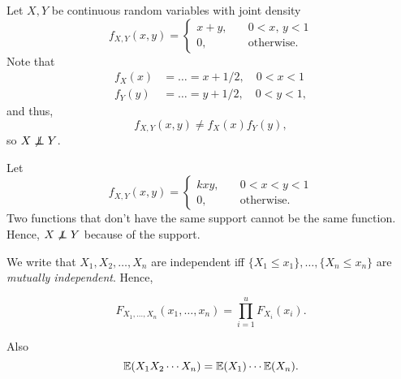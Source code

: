 \begin{eg}
Let $X,Y$ be continuous random variables with joint density
$$
f_{X,Y}(x,y)=\begin{cases}x+y, \quad &0<x, \, y<1 \\ 0, &\text{otherwise}.\end{cases}
$$
Note that
\begin{align*}
    f_X(x)&=\ldots=x+1/2, \quad 0<x<1 \\
    f_Y(y)&=\ldots=y+1/2,\quad 0<y<1,
\end{align*}
and thus,
$$
f_{X,Y}(x,y)\neq f_X(x)f_Y(y),
$$
so $X\not \ind Y$.
\end{eg}

\begin{eg}
Let
$$f_{X,Y}(x,y)=
\begin{cases}kxy, \quad &0<x< y<1 \\ 0, \quad &\text{otherwise}.\end{cases}$$
Two functions that don't have the same support cannot be the same function. Hence, $X\not\ind Y$ because of the support.
\end{eg}

\begin{notation}
		We write that $X_1,X_2,\ldots,X_n$ are independent iff $\{X_1\leq x_1\},\dots,\{X_n\leq x_n\}$ are \textit{mutually independent}. Hence,

$$F_{X_1,\ldots,X_n}(x_1,\dots,x_n)=\prod^u_{i=1} F_{X_i}(x_i).$$

Also
$$
\mathbb E(X_1X_2\cdots X_n)=\mathbb E(X_1)\cdots \mathbb E(X_n).
$$
\end{notation}

